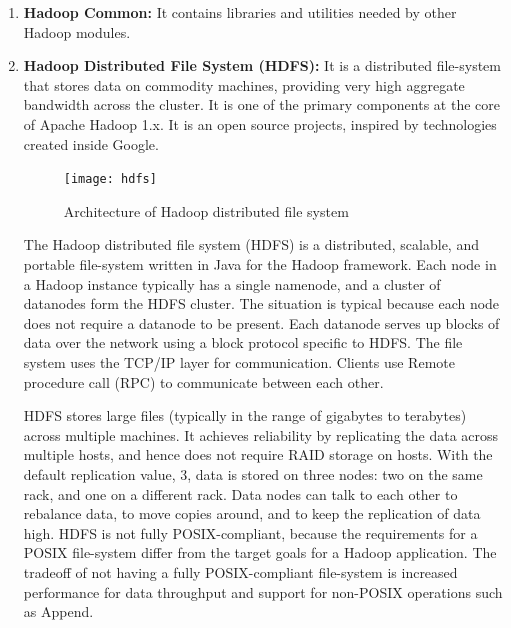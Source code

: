 \documentclass[a4paper,12pt,oneside]{report}
\begin{document}
\begin{enumerate}
        \item \textbf{Hadoop Common:}
                It contains libraries and utilities needed by other Hadoop modules.
        \item \textbf{Hadoop Distributed File System (HDFS):}
                It is a distributed file-system that stores data on commodity machines, providing very high aggregate bandwidth across the cluster.
                It is one of the primary components at the core of Apache Hadoop 1.x. It is an open source projects, inspired by technologies created inside Google.
                \begin{figure}[h!]
                        \centering
                        \texttt{[image: hdfs]}
                        \caption{Architecture of Hadoop distributed file system}
                \end{figure}
                The Hadoop distributed file system (HDFS) is a distributed, scalable, and portable file-system written in 
                Java for the Hadoop framework. Each node in a Hadoop instance typically has a single namenode, and a cluster
                of datanodes form the HDFS cluster. The situation is typical because each node does not require a datanode
                to be present. Each datanode serves up blocks of data over the network using a block protocol specific to
                HDFS. The file system uses the TCP/IP layer for communication. Clients use Remote procedure call (RPC) to
                communicate between each other.\\
                \par HDFS stores large files (typically in the range of gigabytes to terabytes) across multiple machines. It achieves reliability by replicating the data across multiple hosts, and hence does not require RAID storage on hosts. With the default replication value, 3, data is stored on three nodes: two on the same rack, and one on a different rack. Data nodes can talk to each other to rebalance data, to move copies around, and to keep the replication of data high. HDFS is not fully POSIX-compliant, because the requirements for a POSIX file-system differ from the target goals for a Hadoop application. The tradeoff of not having a fully POSIX-compliant file-system is increased performance for data throughput and support for non-POSIX operations such as Append.

\end{enumerate}
\end{document}
